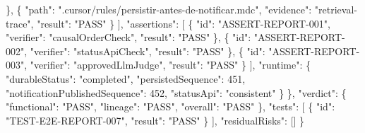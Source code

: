 \documentclass[
  10pt,
  a4paper,
  oneside]{book}
\newenvironment{Shaded}{}{}
\newcommand{\DataTypeTok}[1]{\textcolor[rgb]{0.56,0.13,0.00}{#1}}
\newcommand{\DecValTok}[1]{\textcolor[rgb]{0.25,0.63,0.44}{#1}}
\newcommand{\FunctionTok}[1]{\textcolor[rgb]{0.02,0.16,0.49}{#1}}
\newcommand{\OtherTok}[1]{\textcolor[rgb]{0.00,0.44,0.13}{#1}}
\newcommand{\StringTok}[1]{\textcolor[rgb]{0.25,0.44,0.63}{#1}}
\renewenvironment{Shaded}{\begin{snugshade}}{\end{snugshade}}%
\begin{document}
\begin{Shaded}
\begin{Highlighting}[]
      \FunctionTok{\}}\OtherTok{,}
      \FunctionTok{\{}
        \DataTypeTok{"path"}\FunctionTok{:} \StringTok{".cursor/rules/persistir{-}antes{-}de{-}notificar.mdc"}\FunctionTok{,}
        \DataTypeTok{"evidence"}\FunctionTok{:} \StringTok{"retrieval{-}trace"}\FunctionTok{,}
        \DataTypeTok{"result"}\FunctionTok{:} \StringTok{"PASS"}
      \FunctionTok{\}}
    \OtherTok{]}\FunctionTok{,}
    \DataTypeTok{"assertions"}\FunctionTok{:} \OtherTok{[}
      \FunctionTok{\{}
        \DataTypeTok{"id"}\FunctionTok{:} \StringTok{"ASSERT{-}REPORT{-}001"}\FunctionTok{,}
        \DataTypeTok{"verifier"}\FunctionTok{:} \StringTok{"causalOrderCheck"}\FunctionTok{,}
        \DataTypeTok{"result"}\FunctionTok{:} \StringTok{"PASS"}
      \FunctionTok{\}}\OtherTok{,}
      \FunctionTok{\{}
        \DataTypeTok{"id"}\FunctionTok{:} \StringTok{"ASSERT{-}REPORT{-}002"}\FunctionTok{,}
        \DataTypeTok{"verifier"}\FunctionTok{:} \StringTok{"statusApiCheck"}\FunctionTok{,}
        \DataTypeTok{"result"}\FunctionTok{:} \StringTok{"PASS"}
      \FunctionTok{\}}\OtherTok{,}
      \FunctionTok{\{}
        \DataTypeTok{"id"}\FunctionTok{:} \StringTok{"ASSERT{-}REPORT{-}003"}\FunctionTok{,}
        \DataTypeTok{"verifier"}\FunctionTok{:} \StringTok{"approvedLlmJudge"}\FunctionTok{,}
        \DataTypeTok{"result"}\FunctionTok{:} \StringTok{"PASS"}
      \FunctionTok{\}}
    \OtherTok{]}\FunctionTok{,}
    \DataTypeTok{"runtime"}\FunctionTok{:} \FunctionTok{\{}
      \DataTypeTok{"durableStatus"}\FunctionTok{:} \StringTok{"completed"}\FunctionTok{,}
      \DataTypeTok{"persistedSequence"}\FunctionTok{:} \DecValTok{451}\FunctionTok{,}
      \DataTypeTok{"notificationPublishedSequence"}\FunctionTok{:} \DecValTok{452}\FunctionTok{,}
      \DataTypeTok{"statusApi"}\FunctionTok{:} \StringTok{"consistent"}
    \FunctionTok{\}}
  \FunctionTok{\},}
  \DataTypeTok{"verdict"}\FunctionTok{:} \FunctionTok{\{}
    \DataTypeTok{"functional"}\FunctionTok{:} \StringTok{"PASS"}\FunctionTok{,}
    \DataTypeTok{"lineage"}\FunctionTok{:} \StringTok{"PASS"}\FunctionTok{,}
    \DataTypeTok{"overall"}\FunctionTok{:} \StringTok{"PASS"}
  \FunctionTok{\},}
  \DataTypeTok{"tests"}\FunctionTok{:} \OtherTok{[}
    \FunctionTok{\{}
      \DataTypeTok{"id"}\FunctionTok{:} \StringTok{"TEST{-}E2E{-}REPORT{-}007"}\FunctionTok{,}
      \DataTypeTok{"result"}\FunctionTok{:} \StringTok{"PASS"}
    \FunctionTok{\}}
  \OtherTok{]}\FunctionTok{,}
  \DataTypeTok{"residualRisks"}\FunctionTok{:} \OtherTok{[]}
\FunctionTok{\}}
\end{Highlighting}
\end{Shaded}
\end{document}
